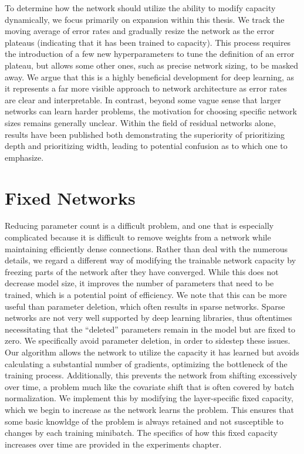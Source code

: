 To determine how the network should utilize the ability to modify capacity dynamically, we focus primarily on expansion within this thesis.
We track the moving average of error rates and gradually resize the network as the error plateaus (indicating that it has been trained to capacity).
This process requires the introduction of a few new hyperparameters to tune the definition of an error plateau, but allows some other ones, such as  precise network sizing, to be masked away.
We argue that this is a highly beneficial development for deep learning, as it represents a far more visible approach to network architecture as error rates are clear and interpretable.
In contrast, beyond some vague sense that larger networks can learn harder problems, the motivation for choosing specific network sizes remains generally unclear.
Within the field of residual networks alone, results have been published both demonstrating the superiority of prioritizing depth and prioritizing width, leading to potential confusion as to which one to emphasize.


\section{Fixed Networks}
Reducing parameter count is a difficult problem, and one that is especially complicated because it is difficult to remove weights from a network while maintaining efficiently dense connections.
Rather than deal with the numerous details, we regard a different way of modifying the trainable network capacity by freezing parts of the network after they have converged.
While this does not decrease model size, it improves the number of parameters that need to be trained, which is a potential point of efficiency.
We note that this can be more useful than parameter deletion, which often results in sparse networks.
Sparse networks are not very well supported by deep learning libraries, thus oftentimes necessitating that the ``deleted'' parameters remain in the model but are fixed to zero.
We specifically avoid parameter deletion, in order to sidestep these issues.
Our algorithm allows the network to utilize the capacity it has learned but avoids calculating a substantial number of gradients, optimizing the bottleneck of the training process.
Additionally, this prevents the network from shifting excessively over time, a problem much like the covariate shift that is often covered by batch normalization.
We implement this by modifying the layer-specific fixed capacity, which we begin to increase as the network learns the problem.
This ensures that some basic knowldge of the problem is always retained and not susceptible to changes by each training minibatch.
The specifics of how this fixed capacity increases over time are provided in the experiments chapter.

